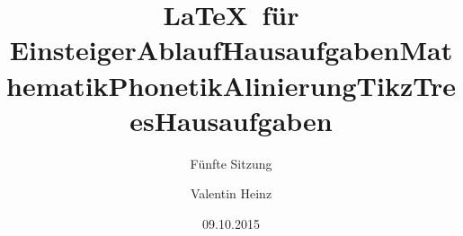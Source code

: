 \documentclass[]{beamer}
\date{}
\author{Valentin Heinz}
\title{\LaTeX \ für Einsteiger}
\date{09.10.2015}
\subtitle{Fünfte Sitzung}
\begin{document}
\maketitle

\title{Ablauf}


\title{Hausaufgaben}


\title{Mathematik}


\title{Phonetik}


\title{Alinierung}


\title{Tikz}


\title{Trees}


\title{Hausaufgaben}

\end{document}
